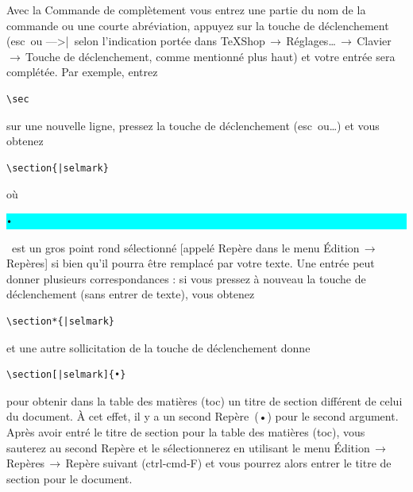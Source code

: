 \documentclass[11pt,french]{article}
\newcommand{\esckey}{\textsf{esc}}
\newcommand{\tabkey}{---\kern-5pt>|}
\newcommand{\mnu}[1]{\textsf{#1}}
\newcommand{\cmd}[1]{\textsf{#1}}
\newcommand{\To}{\,\(\to\)\,}
\newcommand{\selmark}{\colorbox{cyan}{\rule[-0.5ex]{0ex}{2.1ex}\texttt{•}}}
\begin{document}
Avec la \cmd{Commande de complètement} vous entrez une partie du nom de la commande ou une courte abréviation, appuyez sur la touche de déclenchement (\esckey\ ou \tabkey\, selon l'indication portée dans \mnu{TeXShop}\To\mnu{Réglages…}\To\mnu{Clavier}\To\mnu{Touche de déclenchement}, comme mentionné plus haut) et votre entrée sera complétée. Par exemple, entrez
\begin{verbatim}
\sec
\end{verbatim}
sur une nouvelle ligne, pressez la touche de déclenchement (\esckey\ ou…) et vous obtenez
\begin{verbatim}
\section{|selmark}
\end{verbatim}
où \selmark\ est un gros point rond sélectionné [appelé \cmd{Repère} dans le menu \mnu{Édition}\To\mnu{Repères}] si bien qu'il pourra être  remplacé par votre texte. Une entrée peut donner plusieurs correspondances : si vous pressez à nouveau la touche de déclenchement (sans entrer de texte), vous obtenez
\begin{verbatim}
\section*{|selmark}
\end{verbatim}
et une autre sollicitation de la touche de déclenchement donne
\begin{verbatim}
\section[|selmark]{•}
\end{verbatim}
pour obtenir dans la table des matières (\cmd{toc}) un titre de section différent de celui du document. À cet effet, il y a un second \cmd{Repère}~(•) pour le second argument. Après avoir entré le titre de section pour la table des matières (\cmd{toc}), vous sauterez au second \cmd{Repère} et le sélectionnerez en utilisant le menu \mnu{Édition}\To\mnu{Repères}\To\mnu{Repère suivant} (\cmd{ctrl-cmd-F}) et vous pourrez alors entrer le titre de section pour le document.\medskip
\end{document}
